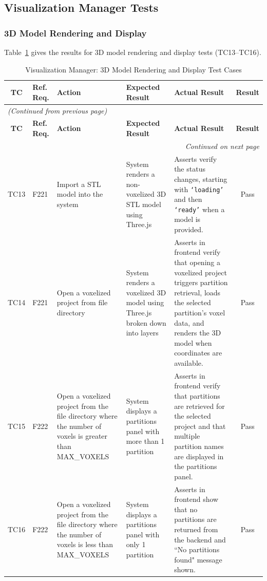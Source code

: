 \documentclass[12pt, titlepage]{article}
\begin{document}
\subsection{Visualization Manager Tests}

\subsubsection{3D Model Rendering and Display}
Table~\ref{table:vm_rendering_tests} gives the results for 3D model rendering and display tests (TC13--TC16).

\begin{longtable}{c
    >{\raggedright\arraybackslash}p{1.5cm}
    >{\raggedright\arraybackslash}p{3cm}
    >{\raggedright\arraybackslash}p{3cm}
  >{\raggedright\arraybackslash}p{5cm} c}
  \caption{Visualization Manager: 3D Model Rendering and Display Test Cases}
  \label{table:vm_rendering_tests} \\
  \toprule
  \textbf{TC} & \textbf{Ref. Req.} & \textbf{Action} &
  \textbf{Expected Result} & \textbf{Actual Result} & \textbf{Result} \\
  \midrule
  \endfirsthead

  \multicolumn{6}{l}{\textit{(Continued from previous page)}} \\
  \toprule
  \textbf{TC} & \textbf{Ref. Req.} & \textbf{Action} &
  \textbf{Expected Result} & \textbf{Actual Result} & \textbf{Result} \\
  \midrule
  \endhead

  \multicolumn{6}{r}{\textit{Continued on next page}} \\
  \endfoot

  \bottomrule
  \endlastfoot

  TC13 & F221 & Import a STL model into the system & System renders a non-voxelized 3D STL model using Three.js & Asserts verify the status changes, starting with \texttt{`loading'} and then \texttt{`ready'} when a model is provided. & \cellcolor{green} Pass \\ \midrule
  TC14 & F221 & Open a voxelized project from file directory & System renders a voxelized 3D model using Three.js broken down into layers & Asserts in frontend verify that opening a voxelized project triggers partition retrieval, loads the selected partition's voxel data, and renders the 3D model when coordinates are available. & \cellcolor{green} Pass \\ \midrule
  TC15 & F222 & Open a voxelized project from the file directory where the number of voxels is greater than MAX\_VOXELS & System displays a partitions panel with more than 1 partition & Asserts in frontend verify that partitions are retrieved for the selected project and that multiple partition names are displayed in the partitions panel. & \cellcolor{green} Pass \\ \midrule
  TC16 & F222 & Open a voxelized project from the file directory where the number of voxels is less than MAX\_VOXELS & System displays a partitions panel with only 1 partition &Asserts in frontend show that no partitions are returned from the backend and ``No partitions found" message shown. & \cellcolor{green} Pass \\


\end{longtable}
\end{document}

